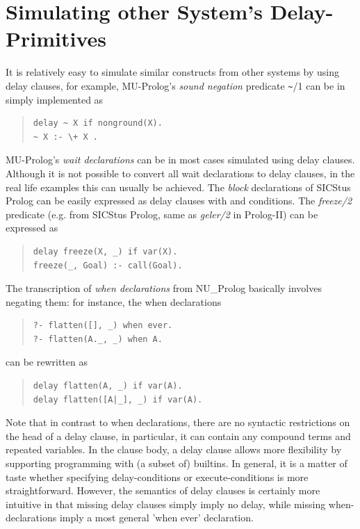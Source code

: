 


\section{Simulating other System's Delay-Primitives}
It is relatively easy to simulate similar constructs from other
systems by using delay clauses,
for example, MU-Prolog's {\it sound negation} predicate \verb+~+/1
can be in {\eclipse} simply implemented as
\begin{quote}\begin{verbatim}
delay ~ X if nonground(X).
~ X :- \+ X .
\end{verbatim}\end{quote}
MU-Prolog's {\it wait declarations} can be in most cases
simulated using delay clauses.
Although it is not possible to convert all wait declarations
to delay clauses, in the real life examples
this can usually be achieved.
The {\it block} declarations of SICStus Prolog can be easily expressed
as delay clauses with  and  conditions.
The {\it freeze/2} predicate (e.g. from SICStus Prolog, same as
{\it geler/2} in Prolog-II) can be expressed as
\begin{quote}\begin{verbatim}
delay freeze(X, _) if var(X).
freeze(_, Goal) :- call(Goal).
\end{verbatim}\end{quote}
The transcription of {\it when declarations} from NU_Prolog
basically involves negating them:
for instance, the when declarations
\begin{quote}\begin{verbatim}
?- flatten([], _) when ever.
?- flatten(A._, _) when A.
\end{verbatim}\end{quote}
can be rewritten as
\begin{quote}\begin{verbatim}
delay flatten(A, _) if var(A).
delay flatten([A|_], _) if var(A).
\end{verbatim}\end{quote}
Note that in contrast to when declarations,
there are no syntactic restrictions on the head of a delay clause,
in particular, it can contain any compound terms and repeated variables.
In the clause body, a delay clause allows more flexibility by supporting
programming with (a subset of) builtins.
In general, it is a matter of taste whether specifying delay-conditions
or execute-conditions is more straightforward.
However, the semantics of delay clauses is certainly more intuitive in
that missing delay clauses simply imply no delay, while missing
when-declarations imply a most general 'when ever' declaration.


